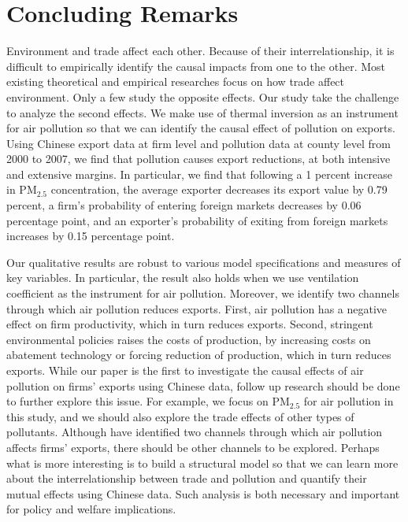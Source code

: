 \documentclass[12pt]{article}
\begin{document}
\section{Concluding Remarks}  
Environment and trade affect each other. Because of their interrelationship, it is difficult to empirically identify the causal impacts from one to the other. Most existing theoretical and empirical researches focus on how trade affect environment. Only a few study the opposite effects. Our study take the challenge to analyze the second effects. We make use of thermal inversion as an instrument for air pollution so that we can identify the causal effect of pollution on exports. Using Chinese export data at firm level and pollution data at county level from 2000 to 2007, we find that pollution causes export reductions, at both intensive and extensive margins. In particular, we find that following a 1 percent increase in $\mathrm{PM_{2.5}}$ concentration, the average exporter decreases its export value by 0.79 percent, a firm's probability of entering foreign markets decreases by 0.06 percentage point, and an exporter's probability of exiting from foreign markets increases by 0.15 percentage point. 

Our qualitative results are robust to various model specifications and measures of key variables. In particular, the result also holds when we use ventilation coefficient as the instrument for air pollution. Moreover, we identify two channels through which air pollution reduces exports. First, air pollution has a negative effect on firm productivity, which in turn reduces exports. Second, stringent environmental policies raises the costs of production, by increasing costs on abatement technology or forcing reduction of production, which in turn reduces exports. While our paper is the first to investigate the causal effects of air pollution on firms' exports using Chinese data, follow up research should be done to further explore this issue. For example, we focus on $\mathrm{PM_{2.5}}$ for air pollution in this study, and we should also explore the trade effects of other types of pollutants. Although have identified two channels through which air pollution affects firms' exports, there should be other channels to be explored. Perhaps what is more interesting is to build a structural model so that we can learn more about the interrelationship between trade and pollution and quantify their mutual effects using Chinese data. Such analysis is both necessary and important for policy and welfare implications.  
\end{document}
